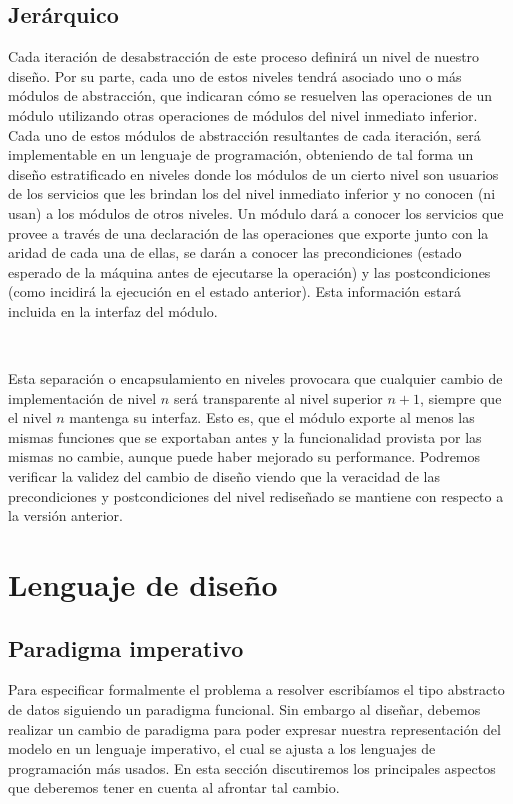 \subsection{Jer\'arquico}

Cada iteraci\'on de desabstracci\'on de este proceso definir\'a un nivel de nuestro dise\~no. Por su parte, cada uno de estos niveles tendr\'a asociado uno o m\'as m\'odulos de abstracci\'on, que indicaran c\'omo se resuelven las operaciones de un m\'odulo utilizando otras operaciones de m\'odulos del nivel inmediato inferior. Cada uno de estos m\'odulos de abstracci\'on resultantes de cada iteraci\'on, ser\'a implementable en un lenguaje de programaci\'on, obteniendo de tal forma un dise\~no estratificado en niveles donde los m\'odulos de un cierto nivel son usuarios de los servicios que les brindan los del nivel inmediato inferior y no conocen (ni usan) a los m\'odulos de otros niveles. Un m\'odulo dar\'a a conocer los servicios que provee a trav\'es de una declaraci\'on de las operaciones que exporte junto con la aridad de cada una de ellas, se dar\'an a conocer las precondiciones (estado esperado de la m\'aquina antes de ejecutarse la operaci\'on) y las postcondiciones (como incidir\'a la ejecuci\'on en
el estado anterior). Esta informaci\'on estar\'a incluida en la interfaz del m\'odulo.

~

Esta separaci\'on o encapsulamiento en niveles provocara que cualquier cambio de implementaci\'on de nivel $n$ ser\'a transparente al nivel superior $n+1$, siempre que el nivel $n$ mantenga su interfaz. Esto es, que el m\'odulo exporte al menos las mismas funciones que se exportaban antes y la funcionalidad provista por las mismas no cambie, aunque puede haber mejorado su performance. Podremos verificar la validez del cambio de dise\~no viendo que la veracidad de las precondiciones y postcondiciones del nivel redise\~nado se mantiene con respecto a la versi\'on anterior.

\section{Lenguaje de dise\~no}

\subsection{Paradigma imperativo}

Para especificar formalmente el problema a resolver escrib\'iamos el tipo abstracto de datos siguiendo un paradigma funcional. Sin embargo al dise\~nar, debemos realizar un cambio de paradigma para poder expresar nuestra representaci\'on del modelo en un lenguaje imperativo, el cual se ajusta a los lenguajes de programaci\'on m\'as usados. En esta secci\'on discutiremos los principales aspectos que deberemos tener en cuenta al afrontar tal cambio.

